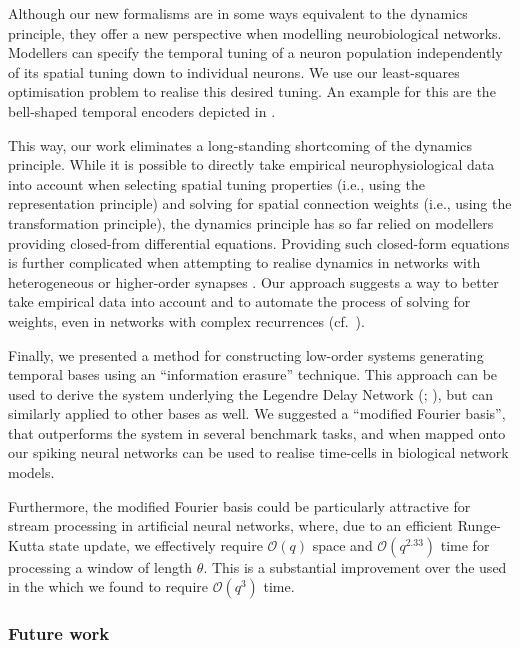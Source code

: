 Although our new formalisms are in some ways equivalent to the \NEF dynamics principle, they offer a new perspective when modelling neurobiological networks.
Modellers can specify the temporal tuning of a neuron population independently of its spatial tuning down to individual neurons.
We use our least-squares optimisation problem to realise this desired tuning.
An example for this are the bell-shaped temporal encoders depicted in .

This way, our work eliminates a long-standing shortcoming of the \NEF dynamics principle.
While it is possible to directly take empirical neurophysiological data into account when selecting spatial tuning properties (i.e., using the representation principle) and solving for spatial connection weights (i.e., using the transformation principle), the dynamics principle has so far relied on modellers providing closed-from differential equations.
Providing such closed-form equations is further complicated when attempting to realise dynamics in networks with heterogeneous or higher-order synapses \citep{voelker2018improving}.
Our approach suggests a way to better take empirical data into account and to automate the process of solving for weights, even in networks with complex recurrences (cf.~).

Finally, we presented a method for constructing low-order \LTI systems generating temporal bases using an \enquote{information erasure} technique.
This approach can be used to derive the \LTI system underlying the Legendre Delay Network (\LDN; \cite{voelker2018improving}), but can similarly applied to other bases as well.
We suggested a \enquote{modified Fourier basis}, that outperforms the \LDN system in several benchmark tasks, and when mapped onto our spiking neural networks can be used to realise time-cells in biological network models.

Furthermore, the modified Fourier basis could be particularly attractive for stream processing in artificial neural networks, where, due to an efficient Runge-Kutta state update, we effectively require $\mathcal{O}(q)$ space and $\mathcal{O}(q^{2.33})$ time for processing a window of length $\theta$.
This is a substantial improvement over the \LDN used in the \LMU which we found to require $\mathcal{O}(q^3)$ time.

\subsubsection{Future work}

